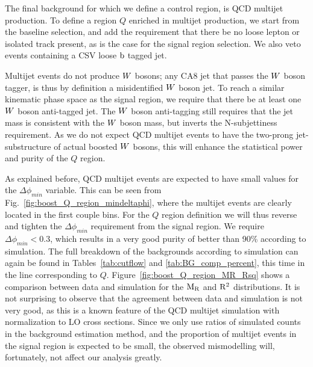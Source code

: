 The final background for which we define a control region, is QCD multijet production.
To define a region $Q$ enriched in multijet production, we start from the baseline selection, and
add the requirement that there be no loose lepton or isolated track present, as is the case for the
signal region selection. We also veto events containing a CSV loose $\mathrm{b}$ tagged jet. 

Multijet events do not produce $W$ bosons; any CA8 jet that passes the $W$ boson tagger,
is thus by definition a misidentified $W$ boson jet. To reach a similar kinematic phase space as
the signal region, we require that there be at least one $W$ boson anti-tagged jet. The $W$ boson
anti-tagging still requires that the jet mass is consistent with the $W$ boson mass, but inverts
the N-subjettiness requirement. As we do not expect QCD multijet events to have the two-prong
jet-substructure of actual boosted $W$ bosons, this will enhance the statistical power and purity
of the $Q$ region. 

As explained before, QCD multijet events are expected to have small values for the
$\Delta\phi_{min}$ variable. This can be seen from Fig.~\ref{fig:boost_Q_region_mindeltaphi},
where the multijet events are clearly located in the first couple bins. 
For the $Q$ region definition we will thus reverse
and tighten the $\Delta\phi_{min}$ requirement from the signal region. We require $\Delta\phi_{min}
< 0.3$, which results in a very good purity of better than 90\% according to simulation. 
The full breakdown of the backgrounds according to simulation can again be found in
Tables~\ref{tab:cutflow} and \ref{tab:BG_comp_percent}, this time in the line corresponding to $Q$.
Figure~\ref{fig:boost_Q_region_MR_Rsq} shows a comparison between data and simulation for the $\mathrm{M_R}$
and $\mathrm{R^2}$ distributions. It is not surprising to observe that the agreement between data and
simulation is not very good, as this is a known feature of the QCD multijet simulation with
normalization to LO cross sections. Since we only use ratios of simulated counts in the background
estimation method, and the proportion of multijet events in the signal region is expected to
be small, the observed mismodelling will, fortunately, not affect our analysis greatly. 

